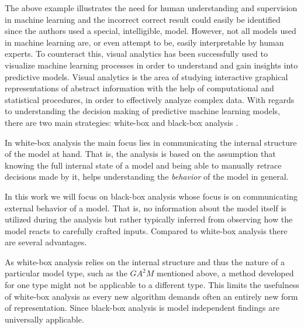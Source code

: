 The above example illustrates the need for human understanding and supervision in machine learning and the incorrect correct result could easily be identified since the authors used a special, intelligible, model. However, not all models used in machine learning are, or even attempt to be, easily interpretable by human experts. To counteract this, visual analytics has been successfully used to visualize machine learning processes in order to understand and gain insights into predictive models. Visual analytics is the area of studying interactive graphical representations of abstract information with the help of computational and statistical procedures, in order to effectively analyze complex data. With regards to understanding the decision making of predictive machine learning models, there are two main strategies: white-box and black-box analysis \cite{class_signatures}.

In white-box analysis the main focus lies in communicating the internal structure of the model at hand. That is, the analysis is based on the assumption that knowing the full internal state of a model and being able to manually retrace decisions made by it, helps understanding the \emph{behavior} of the model in general.

In this work we will focus on black-box analysis whose focus is on communicating external behavior of a model. That is, no information about the model itself is utilized during the analysis but rather typically inferred from observing how the model reacts to carefully crafted inputs. Compared to white-box analysis there are several advantages.

As white-box analysis relies on the internal structure and thus the nature of a particular model type, such as the $GA^2M$ mentioned above, a method developed for one type might not be applicable to a different type. This limits the usefulness of white-box analysis as every new algorithm demands often an entirely new form of representation. Since black-box analysis is model independent findings are universally applicable.


